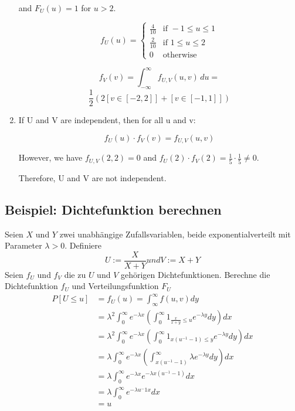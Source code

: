 \begin{tiny}
\begin{enumerate}[noitemsep,topsep=0pt,parsep=0pt,partopsep=0pt]
          and $F_U(u) = 1$ for $u > 2$.

          \[
            f_U(u) = \begin{cases}
              \frac{4}{10} & \text{if } -1 \leq u \leq 1 \\
              \frac{2}{10} & \text{if } 1 \leq u \leq 2  \\
              0            & \text{otherwise}
            \end{cases}
          \]

          \[
            f_V(v) = \int_{-\infty}^{\infty} f_{U,V}(u,v) \, du =
          \]
          \[
            \frac{1}{2}\left(2[v \in [-2,2]] + [v \in [-1,1]]\right)
          \]

    \item If U and V are independent, then for all u and v:

          \[
            f_U(u) \cdot f_V(v) = f_{U,V}(u,v)
          \]

          However, we have \(f_{U,V}(2,2) = 0\) and \(f_U(2) \cdot f_V(2) = \frac{1}{5}
          \cdot \frac{1}{5} \neq 0\).

          Therefore, U and V are not independent.
  \end{enumerate}
\end{tiny}
\BoxEnd{}
\BoxStart{}

\subsection{Beispiel: Dichtefunktion berechnen}
Seien $X$ und $Y$ zwei unabhängige Zufallsvariablen, beide exponentialverteilt mit
Parameter $\lambda > 0$. Definiere
\[
  U := \frac{X}{X + Y} und V := X + Y
\]
Seien $f_U$ und $f_V$ die zu $U$ und $V$ gehörigen Dichtefunktionen. Berechne
die Dichtefunktion $f_U$ und Verteilungsfunktion $F_U$
\begin{align*}
  P[U \leq u] & = f_U(u) = \int_\infty^\infty f(u, v) dy                                                                        \\
              & = \lambda^2 \int_0^\infty e^{-\lambda x} \left(\int_0^\infty 1_{\frac{x}{x + y}\leq u}e^{-\lambda y}dy\right)dx \\
              & = \lambda^2 \int_0^\infty e^{-\lambda x} \left(\int_0^\infty 1_{x(u^{-1} - 1)\leq y}e^{-\lambda y}dy\right)dx   \\
              & = \lambda \int_0^\infty e^{-\lambda x} \left(\int_{x(u^{-1} -1)}^\infty \lambda e^{-\lambda y}dy\right)dx       \\
              & = \lambda \int_0^\infty e^{-\lambda x} e^{-\lambda x (u^{-1} -1)}dx                                             \\
              & = \lambda \int_0^\infty e^{-\lambda u^-1 x}dx                                                                   \\
              & = u
\end{align*}

